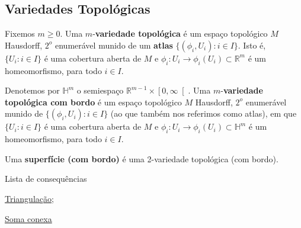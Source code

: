 \subsection{Variedades Topológicas}
\label{variedade-def}
\begin{defi}
	Fixemos $m\geq 0$. Uma $m$-\textbf{variedade topológica} é um espaço topológico $M$ Hausdorff, $2^o$ enumerável munido de um \textbf{atlas} $\{(\phi_i, U_i) : i \in I\}$. Isto é, $\{U_i : i \in I\}$ é uma cobertura aberta de $M$ e $\phi_i: U_i \to \phi_i(U_i) \subset \mathbb{R}^m$ é um homeomorfismo, para todo $i \in I$.
    
    Denotemos por $\mathbb{H}^m$ o semiespaço $\mathbb{R}^{m-1}\times \left[0,\infty\right[$. Uma $m$-\textbf{variedade topológica com bordo} é um espaço topológico $M$ Hausdorff, $2^o$ enumerável munido de $\{(\phi_i, U_i) : i \in I\}$ (ao que também nos referimos como atlas), em que $\{U_i : i \in I\}$ é uma cobertura aberta de $M$ e $\phi_i: U_i \to \phi_i(U_i) \subset \mathbb{H}^m$ é um homeomorfismo, para todo $i \in I$.

Uma \textbf{superfície (com bordo)} é uma 2-variedade topológica (com bordo).
\end{defi}

\begin{titlemize}{Lista de consequências}
	\item \hyperref[triangulacao-def]{Triangulação};\\
    \item \hyperref[soma-conexa-def]{Soma conexa}
\end{titlemize}

